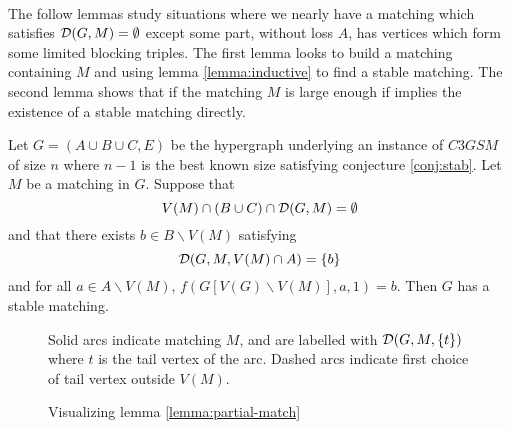 \paragraph{}
The follow lemmas study situations where we nearly have a matching which satisfies $\mathcal{D}(G,M) = \emptyset$ except some part, without loss $A$, has vertices which form some limited blocking triples. The first lemma looks to build a matching containing $M$ and using lemma \ref{lemma:inductive} to find a stable matching. The second lemma shows that if the matching $M$ is large enough if implies the existence of a stable matching directly.

\begin{lemma} \label{lemma:partial-match}Let $G=(A\cup B \cup C, E)$ be the hypergraph underlying an instance of $C3GSM$ of size $n$ where $n-1$ is the best known size satisfying conjecture \ref{conj:stab}. Let $M$ be a matching in $G$. Suppose that
$$ V(M) \cap (B \cup C) \cap \mathcal{D}(G,M) = \emptyset$$
and that there exists $b \in B\backslash V(M)$ satisfying
$$ \mathcal{D}(G, M, V(M) \cap A)  = \{b\}$$
and for all $a \in A \backslash V(M)$, $f(G[V(G)\backslash V(M)], a, 1) = b$. Then $G$ has a stable matching.
\end{lemma}
\begin{figure}[h]
\centering
{}
\caption{Visualizing lemma \ref{lemma:partial-match}}
\small
\begin{flushleft}
Solid arcs indicate matching $M$, and are labelled with $\mathcal{D}(G,M,\{t\})$ where $t$ is the tail vertex of the arc. Dashed arcs indicate first choice of tail vertex outside $V(M)$.
\end{flushleft}
\end{figure}


